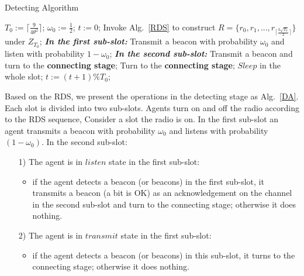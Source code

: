 \begin{algorithm}[!h]
    \caption{Detecting Algorithm}
    \label{DA}
    \begin{algorithmic}[1]
    \STATE $T_0 := \lceil \frac{9}{4\theta^{2}} \rceil$; $\omega_0 :=\frac{1}{2}$; $t := 0$;
    \STATE Invoke Alg.~\ref{RDS} to construct $R = \{r_0, r_1, ...,r_{\lceil 
    \frac{3\sqrt{T_0}}{2}  \rceil}\}$ under $Z_{T_0}$;
          \label{On}
            \STATE \textbf{\emph{In the first sub-slot:}}
            \STATE Transmit a beacon with probability $\omega_0$
            and listen with probability $1-\omega_0$;
            \STATE \textbf{\emph{In the second sub-slot:}}
                    \STATE Transmit a beacon and turn to the \textbf{connecting stage};
                \ENDIF
                \STATE Turn to the \textbf{connecting stage};
            \ENDIF
        \ELSE
                \STATE $Sleep$ in the whole slot;
        \ENDIF
        \STATE $t := (t + 1) \% T_0$;
    \ENDWHILE
    \end{algorithmic}
\end{algorithm}

Based on the RDS, we present the operations in the detecting stage as Alg.~\ref{DA}.
Each slot is divided into two sub-slots.
Agents turn on and off the radio according to the RDS sequence,
Consider a slot the radio is on. In the first sub-slot
an agent transmits a beacon with probability $\omega_0$ and listens with probability $(1-\omega_0)$.
In the second sub-slot: 
\begin{itemize}
    \item[1)] The agent is in $listen$ state in the first sub-slot:
    \begin{itemize}
    \item if the agent detects a beacon (or beacons) in the first sub-slot, it 
    transmits a beacon (a bit is OK) as an acknowledgement 
    on the channel in the second sub-slot and turn to the 
    connecting stage; otherwise it does nothing. 
    \end{itemize}
    \item[2)] The agent is in $transmit$ state in the first sub-slot:
    \begin{itemize}
    \item if the agent detects a beacon (or beacons) in this sub-slot,
    it turns to the connecting stage; otherwise it does nothing.
    \end{itemize}
\end{itemize}

